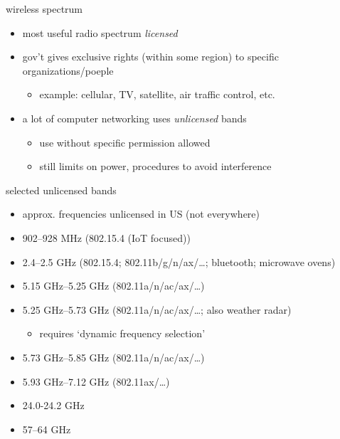 \begin{frame}{wireless spectrum}
    \begin{itemize}
    \item most useful radio spectrum \textit{licensed}
    \item gov't gives exclusive rights (within some region) to specific organizations/poeple 
        \begin{itemize}
        \item example: cellular, TV, satellite, air traffic control, etc.
        \end{itemize}
    \item a lot of computer networking uses \textit{unlicensed} bands
        \begin{itemize}
        \item use without specific permission allowed
        \item still limits on power, procedures to avoid interference
        \end{itemize}
    \end{itemize}
\end{frame}

\begin{frame}{selected unlicensed bands}
    \begin{itemize}
    \item approx. frequencies unlicensed in US (not everywhere)
    \vspace{.5cm}
    \item 902--928 MHz (802.15.4 (IoT focused))
    \item 2.4--2.5 GHz (802.15.4; 802.11b/g/n/ax/\ldots; bluetooth; microwave ovens)
    \item 5.15 GHz--5.25 GHz (802.11a/n/ac/ax/\ldots)
    \item 5.25 GHz--5.73 GHz (802.11a/n/ac/ax/\ldots; also weather radar)
        \begin{itemize}
        \item requires `dynamic frequency selection'
        \end{itemize}
    \item 5.73 GHz--5.85 GHz (802.11a/n/ac/ax/\ldots)
    \item 5.93 GHz--7.12 GHz (802.11ax/\ldots)
    \item 24.0-24.2 GHz
    \item 57--64 GHz
    \end{itemize}
\end{frame}

